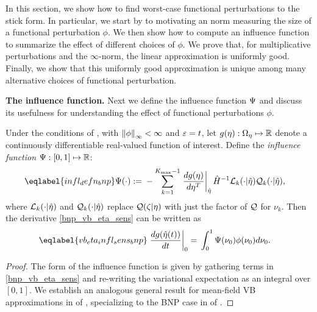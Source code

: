 In this section, we show how to find worst-case functional perturbations to the
stick form. In particular, we start by  to motivating an norm measuring the size
of a functional perturbation $\phi$. We then show how to compute an influence
function to summarize the effect of different choices of $\phi$. We prove that,
for multiplicative perturbations and the $\infty$-norm, the linear approximation
is uniformly good. Finally, we show that this uniformly good approximation is
unique among many alternative choices of functional perturbation.

\noindent \textbf{The influence function.}
%
Next we define the influence function $\Psi$ and discuss its usefulness for
understanding the effect of functional perturbations $\phi$.
%
\begin{cor}
%
Under the conditions of , with $\left\Vert\phi\right\Vert_{\infty} < \infty$ and
$\varepsilon = t$, let $g(\eta): \Omega_{\eta} \mapsto \mathbb{R}$ denote a
continuously differentiable real-valued function of interest.  Define the
\emph{influence function} $\Psi: [0,1] \mapsto \mathbb{R}$:
%
\begin{align} \eqlabel{infl_defn_bnp}
%
\infl(\cdot) :={}&
    - \sum_{k=1}^{\kmax-1} \fracat{d g(\eta)}{ d \eta^T}{\etaopt} \hessopt^{-1}
        \lqgradbark{\cdot \vert \etaopt}
        \qk(\cdot \vert \etaopt),
%
\end{align} where $\mathcal{L}_k({\cdot \vert \hat\eta})$ and $\mathcal{Q}_k(\cdot \vert
\hat\eta)$ replace $\mathcal{Q}(\zeta \vert \eta)$ with just the factor of $\mathcal{Q}$ for
$\nu_k$.
%
Then the derivative \eqref{bnp_vb_eta_sens} can be written as
%
\begin{align} \eqlabel{vb_eta_infl_sens_bnp}
%
\fracat{d \g(\etaopt(\t))}{d \t}{0} ={}&
    \int_0^1 \infl(\nu_0) \phi(\nu_0) d\nu_0.
%
\end{align}
\end{cor}
%
\begin{proof}
%
The form of the influence function is given by gathering terms in
\eqref{bnp_vb_eta_sens} and re-writing the variational expectation as an
integral over $[0,1]$. We establish an analogous general result for mean-field
VB approximations in  of
, specializing to the BNP case in
 of .
%
\end{proof}

